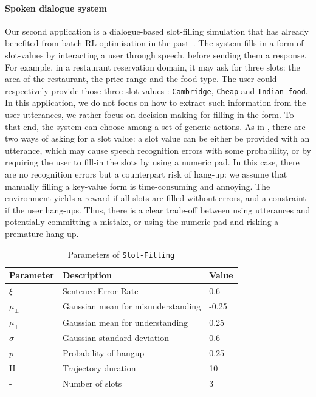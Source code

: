 \paragraph{Spoken dialogue system}
Our second application is a dialogue-based slot-filling simulation that has already benefited from batch RL optimisation in the past~\citep{Li2009ReinforcementLF,chandramohan2010optimizing,pietquin2011sample}. The system fills in a form of slot-values by interacting a user through speech, before sending them a response. For example, in a restaurant reservation domain, it may ask for three slots: the area of the restaurant, the price-range and the food type. The user could respectively provide those three slot-values : \texttt{Cambridge}, \texttt{Cheap} and \texttt{Indian-food}. In this application, we do not focus on how to extract such information from the user utterances, we rather focus on decision-making for filling in the form. To that end, the system can choose among a set of generic actions. As in \citep{carrara2018safe}, there are two ways of asking for a slot value: a slot value can be either be provided with an utterance, which may cause speech recognition errors with some probability, or by requiring the user to fill-in the slots by using a numeric pad. In this case, there are no recognition errors but a counterpart risk of hang-up: we assume that manually filling a key-value form is time-consuming and annoying. The environment yields a reward if all slots are filled without errors, and a constraint if the user hang-ups. Thus, there is a clear trade-off between using utterances and potentially committing a mistake, or using the numeric pad and risking a premature hang-up.

\begin{table}[ht!]
    \centering
    \begin{tabular}{lll}
        \toprule
        Parameter & Description & Value\tabularnewline
        \midrule
        $\xi$ & Sentence Error Rate & 0.6\tabularnewline
        $\mu_{\bot}$& Gaussian mean for misunderstanding & -0.25\tabularnewline
        $\mu_{\top}$& Gaussian mean for understanding & 0.25\tabularnewline
        $\sigma$& Gaussian standard deviation & 0.6\tabularnewline
        $p$& Probability of hangup & 0.25\tabularnewline
        H & Trajectory duration & 10\tabularnewline
        - & Number of slots & 3\tabularnewline
        \bottomrule
    \end{tabular}
    \caption{Parameters of \texttt{Slot-Filling}}
    \label{tab:param-slot-filling}
\end{table}


